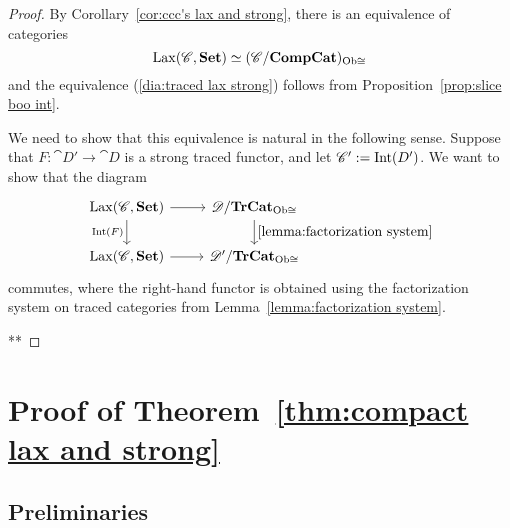 \documentclass[12pt,oneside,article,draft]{memoir}
\begin{document}
\begin{proof}

By Corollary~\ref{cor:ccc's lax and strong}, there is an equivalence of categories 
$$\operatorname{Lax}(\mathscr{C},\mathbf{Set})\simeq(\mathscr{C}/\mathbf{CompCat})_{{\operatorname{Ob}\cong}}$$
and the equivalence (\ref{dia:traced lax strong}) follows from Proposition~\ref{prop:slice boo int}. 

We need to show that this equivalence is natural in the following sense. Suppose that $F\colon\cat{D'}\to\cat{D}$ is a strong traced functor, and let $\mathscr{C'}:=\operatorname{Int}(D')$. We want to show that the diagram 
$$
\begin{tikzcd}
\Lax(\cat{C},\Cat{Set})\arrow[r]\arrow[d,"\Int(F)"']&\cat{D}/\TrCat_{\boo}\arrow[d,"\ref{lemma:factorization system}"]\\
\Lax(\cat{C},\Cat{Set})\arrow[r]&\cat{D'}/\TrCat_{\boo}
\end{tikzcd}
$$
commutes, where the right-hand functor is obtained using the factorization system on traced categories from Lemma~\ref{lemma:factorization system}.

**
\end{proof}




\chapter{Proof of Theorem~\ref{thm:compact lax and strong}}\label{sec:generalization}

\section{Preliminaries}
\end{document}
